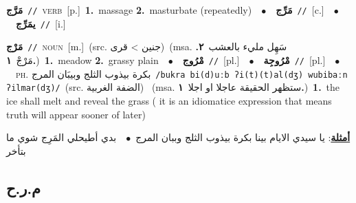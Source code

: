 \documentclass[10pt,a4paper,twoside]{article} %
\begin{document}
\begin{multicols}{2}
{\setlength\topsep{0pt}\textbf{\foreignlanguage{arabic}{مَرَّج}}\ {\color{gray}\texttt{//}\color{black}}\ \textsc{verb}\ [p.]\ \textbf{1.}~massage  \textbf{2.}~masturbate (repeatedly)\ \ $\bullet$\ \ \setlength\topsep{0pt}\textbf{\foreignlanguage{arabic}{مَرِّج}}\ {\color{gray}\texttt{//}\color{black}}\ [c.]\ \ $\bullet$\ \ \setlength\topsep{0pt}\textbf{\foreignlanguage{arabic}{يمَرِّج}}\ {\color{gray}\texttt{//}\color{black}}\ [i.]\ } \vspace{2mm}

{\setlength\topsep{0pt}\textbf{\foreignlanguage{arabic}{مَرْج}}\ {\color{gray}\texttt{//}\color{black}}\ \textsc{noun}\ [m.]\ (src. \color{gray}\foreignlanguage{arabic}{جنين > قرى}\color{black})\ \color{gray}(msa. \foreignlanguage{arabic}{سَهِل مليء بالعشب}~\foreignlanguage{arabic}{\textbf{٢.}}  \foreignlanguage{arabic}{مَرْجْ}~\foreignlanguage{arabic}{\textbf{١.}})\color{black}\ \textbf{1.}~meadow  \textbf{2.}~grassy plain\ \ $\bullet$\ \ \setlength\topsep{0pt}\textbf{\foreignlanguage{arabic}{مْرُوج}}\ {\color{gray}\texttt{//}\color{black}}\ [pl.]\ \ $\bullet$\ \ \setlength\topsep{0pt}\textbf{\foreignlanguage{arabic}{مْرُوجِة}}\ {\color{gray}\texttt{//}\color{black}}\ [pl.]\ \ $\bullet$\ \ \textsc{ph.} \color{gray} \foreignlanguage{arabic}{بكرة بيذوب الثلج وبيبَان المرج}\color{black}\ {\color{gray}\texttt{/{\sffamily bukra bi(d)uːb ʔi(t)(t)al(dʒ) wubibaːn ʔilmar(dʒ)}/}\color{black}}\ \color{gray}(src. \foreignlanguage{arabic}{الضفة الغربية})\color{black}\ \color{gray} (msa. \foreignlanguage{arabic}{ستظهر الحقيقة عاجلا او اجلا}~\foreignlanguage{arabic}{\textbf{١.}})\color{black}\ \textbf{1.}~the ice shall melt and reveal the grass ( it is an idiomatice expression that means truth will appear sooner of later)\  \begin{flushright}\color{gray}\foreignlanguage{arabic}{\textbf{\underline{\foreignlanguage{arabic}{أمثلة}}}: يا سيدي الايام بينا بكرة بيذوب الثلج وببان المرج\ $\bullet$\ \  بدي أطيحلي المَرِج شوي ما بتأخر}\end{flushright}\color{black}} \vspace{2mm}

\vspace{-3mm}
\subsection*{\color{blue}\foreignlanguage{arabic}{م.ر.ح}\color{blue}{}} 


\end{multicols}
\end{document}
